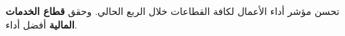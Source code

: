 تحسن مؤشر أداء الأعمال لكافة القطاعات خلال الربع الحالي. وحقق \textbf{قطاع الخدمات المالية} أفضل أداء.
